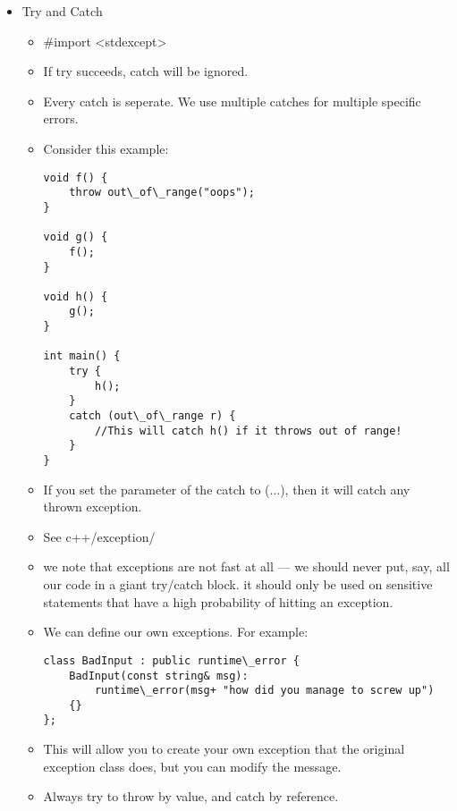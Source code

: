 \documentclass{article}
\begin{document}
\begin{itemize}
\item Try and Catch
\begin{itemize}
\item #import <stdexcept>
\item If try succeeds, catch will be ignored.
\item Every catch is seperate.  We use multiple catches for multiple specific errors.
\item Consider this example:
\begin{lstlisting}
void f() {
    throw out\_of\_range("oops");
}

void g() {
    f();
}

void h() {
    g();
}

int main() {
    try {
        h();
    }
    catch (out\_of\_range r) {
        //This will catch h() if it throws out of range!
    }
}
\end{lstlisting}
\item If you set the parameter of the catch to (...), then it will catch any thrown exception.
\item See c++/exception/
\item we note that exceptions are not fast at all --- we should never put, say, all our code in a giant try/catch block.  it should only be used on sensitive statements that have a high probability of hitting an exception.  
\item We can define our own exceptions.  For example:
\begin{lstlisting}
class BadInput : public runtime\_error {
    BadInput(const string& msg):
        runtime\_error(msg+ "how did you manage to screw up")
    {}
};
\end{lstlisting}
\item This will allow you to create your own exception that the original exception class does, but you can modify the message.
\item Always try to throw by value, and catch by reference.  
\end{itemize}
\end{itemize}
\end{document}
